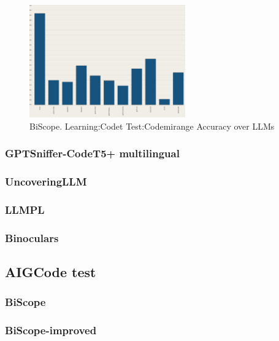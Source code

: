 \begin{figure}[H]
    \centering
    \includegraphics[width=0.6\textwidth]{img/TEST/BiScope/fromCodetCodemirange/accuracy LLM (2).png}
    \caption{BiScope. Learning:Codet Test:Codemirange Accuracy over LLMs}
    \label{fig:BiScope1accLLM}
\end{figure}

\subsubsection{GPTSniffer-CodeT5+ multilingual}



\subsubsection{UncoveringLLM}




\subsubsection{LLMPL}





\subsubsection{Binoculars}



\subsection{AIGCode test}


\subsubsection{BiScope}

\subsubsection{BiScope-improved}


